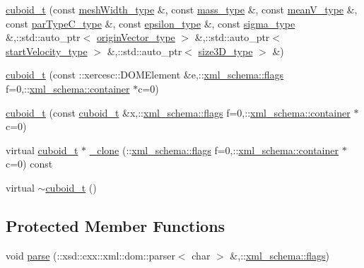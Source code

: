 \begin{DoxyCompactItemize}
\hyperlink{classcuboid__t_a862bcca4943b2c27a5f5edfd361bb4a1}{cuboid\-\_\-t} (const \hyperlink{classcuboid__t_a5759759b1b9e3029ff36c7f20d9213dc}{mesh\-Width\-\_\-type} \&, const \hyperlink{classcuboid__t_a365536fb1db29c6ef0da234297763d61}{mass\-\_\-type} \&, const \hyperlink{classcuboid__t_aea1381b8b1cca3f677ae4a28b29cbe2a}{mean\-V\-\_\-type} \&, const \hyperlink{classcuboid__t_a162caafd069fa127809bb2d573c752c5}{par\-Type\-C\-\_\-type} \&, const \hyperlink{classcuboid__t_ac4a981a7963b1b2105d448cf42ab1230}{epsilon\-\_\-type} \&, const \hyperlink{classcuboid__t_ae1de9c7b1d2b2a9098de31c546c0ff83}{sigma\-\_\-type} \&,\-::std\-::auto\-\_\-ptr$<$ \hyperlink{classcuboid__t_a20d67505efc00dc82947ce881aec1e76}{origin\-Vector\-\_\-type} $>$ \&,\-::std\-::auto\-\_\-ptr$<$ \hyperlink{classcuboid__t_a7b9bd2a7888abc4b08f6f4e91ac9a81f}{start\-Velocity\-\_\-type} $>$ \&,\-::std\-::auto\-\_\-ptr$<$ \hyperlink{classcuboid__t_abf130ab4ed6d70047bb193a41283ec28}{size3\-D\-\_\-type} $>$ \&)
\item 
\hyperlink{classcuboid__t_afa1b7588ca19d8c5d00fb8c5dcf92bc8}{cuboid\-\_\-t} (const \-::xercesc\-::\-D\-O\-M\-Element \&e,\-::\hyperlink{namespacexml__schema_a0612287d030cb2732d31a45b258fdc87}{xml\-\_\-schema\-::flags} f=0,\-::\hyperlink{namespacexml__schema_ada9aa30dc722e93ee2ed7243085402a5}{xml\-\_\-schema\-::container} $\ast$c=0)
\item 
\hyperlink{classcuboid__t_a1574d539277176b5fff09a374c142c90}{cuboid\-\_\-t} (const \hyperlink{classcuboid__t}{cuboid\-\_\-t} \&x,\-::\hyperlink{namespacexml__schema_a0612287d030cb2732d31a45b258fdc87}{xml\-\_\-schema\-::flags} f=0,\-::\hyperlink{namespacexml__schema_ada9aa30dc722e93ee2ed7243085402a5}{xml\-\_\-schema\-::container} $\ast$c=0)
\item 
virtual \hyperlink{classcuboid__t}{cuboid\-\_\-t} $\ast$ \hyperlink{classcuboid__t_aa31bc17c300c78f7c15b08d60bbdefbf}{\-\_\-clone} (\-::\hyperlink{namespacexml__schema_a0612287d030cb2732d31a45b258fdc87}{xml\-\_\-schema\-::flags} f=0,\-::\hyperlink{namespacexml__schema_ada9aa30dc722e93ee2ed7243085402a5}{xml\-\_\-schema\-::container} $\ast$c=0) const 
\item 
virtual \hyperlink{classcuboid__t_ad45791533f3643e2e2f565801c0ca20a}{$\sim$cuboid\-\_\-t} ()
\end{DoxyCompactItemize}
\subsection*{Protected Member Functions}
\begin{DoxyCompactItemize}
\item 
void \hyperlink{classcuboid__t_ab79e4219bf9a205aff7cbbda1207d138}{parse} (\-::xsd\-::cxx\-::xml\-::dom\-::parser$<$ char $>$ \&,\-::\hyperlink{namespacexml__schema_a0612287d030cb2732d31a45b258fdc87}{xml\-\_\-schema\-::flags})
\end{DoxyCompactItemize}
